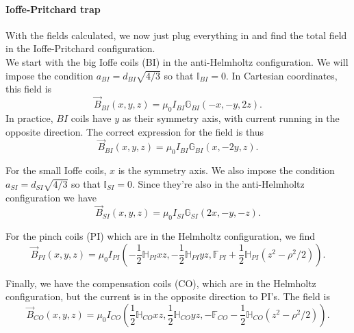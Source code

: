\documentclass{book}
\theoremstyle{definition}
\newcommand{\f}[2]{\frac{#1}{#2}}
\newcommand{\lp}{\left(}
\newcommand{\rp}{\right)}
\begin{document}
\paragraph*{Ioffe-Pritchard trap}
With the fields calculated, we now just plug everything in and find the total field in the Ioffe-Pritchard configuration. \\

We start with the big Ioffe coils (BI) in the anti-Helmholtz configuration. We will impose the condition $a_{BI} = d_{BI}\sqrt{4/3}$ so that $\mathbb{I}_{BI} = 0$. In Cartesian coordinates, this field is 
\begin{equation*}
\vec{B}_{BI}(x,y,z) = \mu_0 I_{BI} \mathbb{G}_{BI}(-x,-y,2z ).
\end{equation*}
In practice, $BI$ coils have $y$ as their symmetry axis, with current running in the opposite direction. The correct expression for the field is thus 
\begin{equation*}
\vec{B}_{BI}(x,y,z) = \mu_0 I_{BI} \mathbb{G}_{BI}(x,-2y,z).
\end{equation*}

For the small Ioffe coils, $x$ is the symmetry axis. We also impose the condition $a_{SI} = d_{SI}\sqrt{4/3}$ so that $\mathbb{I}_{SI} = 0$. Since they're also in the anti-Helmholtz configuration we have
\begin{equation*}
\vec{B}_{SI}(x,y,z) = \mu_0 I_{SI} \mathbb{G}_{SI} (2x,-y,-z).
\end{equation*}

For the pinch coils (PI) which are in the Helmholtz configuration, we find 
\begin{equation*}
\vec{B}_{PI}(x,y,z) = \mu_0 I_{PI} \lp -\f{1}{2}\mathbb{H}_{PI}xz,  -\f{1}{2}\mathbb{H}_{PI}yz, \mathbb{F}_{PI} + \f{1}{2}\mathbb{H}_{PI} \lp z^2 - \rho^2/2 \rp \rp.
\end{equation*}

Finally, we have the compensation coils (CO), which are in the Helmholtz configuration, but the current is in the opposite direction to PI's. The field is 
\begin{equation*}
\vec{B}_{CO}(x,y,z) = \mu_0 I_{CO} \lp \f{1}{2}\mathbb{H}_{CO}xz,  \f{1}{2}\mathbb{H}_{CO}yz, -\mathbb{F}_{CO} - \f{1}{2}\mathbb{H}_{CO} \lp z^2 - \rho^2/2 \rp \rp.
\end{equation*}
\end{document}
